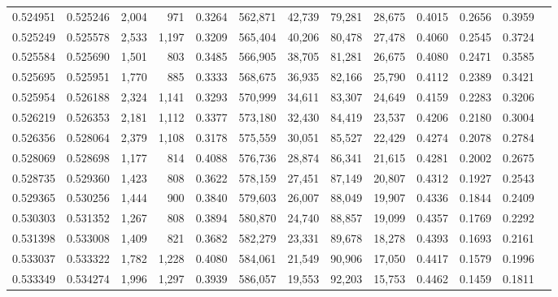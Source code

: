 \begin{tabular}{rrrrrrrrrrrrr}
0.524951 & 0.525246 &  2,004 &   971 &                                     0.3264 & 562,871 &  42,739 &  79,281 &  28,675 & 0.4015 & 0.2656 & 0.3959 \\
0.525249 & 0.525578 &  2,533 & 1,197 &                                     0.3209 & 565,404 &  40,206 &  80,478 &  27,478 & 0.4060 & 0.2545 & 0.3724 \\
0.525584 & 0.525690 &  1,501 &   803 &                                     0.3485 & 566,905 &  38,705 &  81,281 &  26,675 & 0.4080 & 0.2471 & 0.3585 \\
0.525695 & 0.525951 &  1,770 &   885 &                                     0.3333 & 568,675 &  36,935 &  82,166 &  25,790 & 0.4112 & 0.2389 & 0.3421 \\
0.525954 & 0.526188 &  2,324 & 1,141 &                                     0.3293 & 570,999 &  34,611 &  83,307 &  24,649 & 0.4159 & 0.2283 & 0.3206 \\
0.526219 & 0.526353 &  2,181 & 1,112 &                                     0.3377 & 573,180 &  32,430 &  84,419 &  23,537 & 0.4206 & 0.2180 & 0.3004 \\
0.526356 & 0.528064 &  2,379 & 1,108 &                                     0.3178 & 575,559 &  30,051 &  85,527 &  22,429 & 0.4274 & 0.2078 & 0.2784 \\
0.528069 & 0.528698 &  1,177 &   814 &                                     0.4088 & 576,736 &  28,874 &  86,341 &  21,615 & 0.4281 & 0.2002 & 0.2675 \\
0.528735 & 0.529360 &  1,423 &   808 &                                     0.3622 & 578,159 &  27,451 &  87,149 &  20,807 & 0.4312 & 0.1927 & 0.2543 \\
0.529365 & 0.530256 &  1,444 &   900 &                                     0.3840 & 579,603 &  26,007 &  88,049 &  19,907 & 0.4336 & 0.1844 & 0.2409 \\
0.530303 & 0.531352 &  1,267 &   808 &                                     0.3894 & 580,870 &  24,740 &  88,857 &  19,099 & 0.4357 & 0.1769 & 0.2292 \\
0.531398 & 0.533008 &  1,409 &   821 &                                     0.3682 & 582,279 &  23,331 &  89,678 &  18,278 & 0.4393 & 0.1693 & 0.2161 \\
0.533037 & 0.533322 &  1,782 & 1,228 &                                     0.4080 & 584,061 &  21,549 &  90,906 &  17,050 & 0.4417 & 0.1579 & 0.1996 \\
0.533349 & 0.534274 &  1,996 & 1,297 &                                     0.3939 & 586,057 &  19,553 &  92,203 &  15,753 & 0.4462 & 0.1459 & 0.1811 \\

\end{tabular}
